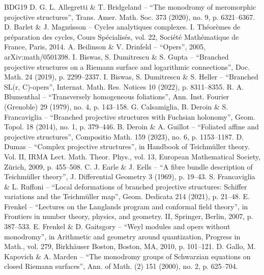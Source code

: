 \begin{thebibliography}{BDG19}
 D. G. L. Allegretti \& T. Bridgeland – “The monodromy of meromorphic projective structures”, Trans. Amer. Math. Soc. 373 (2020), no. 9, p. 6321–6367.
 D. Barlet \& J. Magnússon – Cycles analytiques complexes. I. Théorèmes de préparation des cycles, Cours Spécialisés, vol. 22, Société Mathématique de France, Paris, 2014.
 A. Beilinson \& V. Drinfeld – “Opers”, 2005, arXiv:math/0501398.
 I. Biswas, S. Dumitrescu \& S. Gupta – “Branched projective structures on a Riemann surface and logarithmic connections”, Doc. Math. 24 (2019), p. 2299–2337.
 I. Biswas, S. Dumitrescu \& S. Heller – “Branched SL(r, C)-opers”, Internat. Math. Res. Notices 10 (2022), p. 8311–8355.
 R. A. Blumenthal – “Transversely homogeneous foliations”, Ann. Inst. Fourier (Grenoble) 29 (1979), no. 4, p. 143–158.
 G. Calsamiglia, B. Deroin \& S. Francaviglia – “Branched projective structures with Fuchsian holonomy”, Geom. Topol. 18 (2014), no. 1, p. 379–446.
 B. Deroin \& A. Guillot – “Foliated affine and projective structures”, Compositio Math. 159 (2023), no. 6, p. 1153–1187.
 D. Dumas – “Complex projective structures”, in Handbook of Teichmüller theory. Vol. II, IRMA Lect. Math. Theor. Phys., vol. 13, European Mathematical Society, Zürich, 2009, p. 455–508.
 C. J. Earle \& J. Eells – “A fibre bundle description of Teichmüller theory”, J. Differential Geometry 3 (1969), p. 19–43.
 S. Francaviglia \& L. Ruffoni – “Local deformations of branched projective structures: Schiffer variations and the Teichmüller map”, Geom. Dedicata 214 (2021), p. 21–48.
 E. Frenkel – “Lectures on the Langlands program and conformal field theory”, in Frontiers in number theory, physics, and geometry. II, Springer, Berlin, 2007, p. 387–533.
 E. Frenkel \& D. Gaitsgory – “Weyl modules and opers without monodromy”, in Arithmetic and geometry around quantization, Progress in Math., vol. 279, Birkhäuser Boston, Boston, MA, 2010, p. 101–121.
 D. Gallo, M. Kapovich \& A. Marden – “The monodromy groups of Schwarzian equations on closed Riemann surfaces”, Ann. of Math. (2) 151 (2000), no. 2, p. 625–704.

\end{thebibliography}
